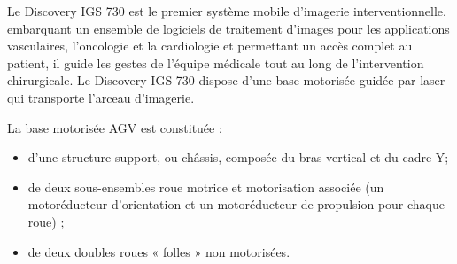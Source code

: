 \documentclass[10pt,fleqn]{article} %
\begin{document}
\def\pathfig{images}

\vspace{4.5cm}
\pagestyle{fancy}
\thispagestyle{plain}

\def\columnseprulecolor{\color{ocre}}
\setlength{\columnseprule}{0.4pt} 

\def\pathfig{images}

\ifprof
\else
\begin{multicols}{2}
\fi

Le Discovery IGS 730 est le premier système
mobile d’imagerie interventionnelle. embarquant un ensemble de logiciels de traitement d’images
pour les applications vasculaires, l’oncologie et la cardiologie et permettant un accès complet
au patient, il guide les gestes de l’équipe médicale tout au long de l’intervention chirurgicale. Le Discovery IGS 730 dispose d’une base motorisée guidée par laser qui transporte l’arceau d’imagerie.
%


La base motorisée AGV est constituée :
\begin{itemize}
\item d’une structure support, ou châssis, composée du bras vertical et du cadre Y;
\item de deux sous-ensembles roue motrice et motorisation associée (un motoréducteur d’orientation
et un motoréducteur de propulsion pour chaque roue) ;
\item de deux doubles roues « folles » non motorisées.
\end{itemize}


\end{multicols}
\end{document}
